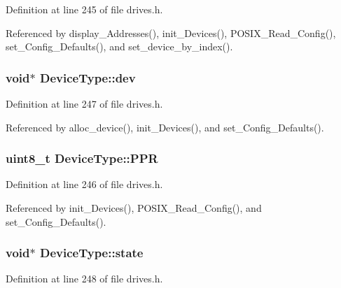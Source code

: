 Definition at line 245 of file drives.\+h.



Referenced by display\+\_\+\+Addresses(), init\+\_\+\+Devices(), P\+O\+S\+I\+X\+\_\+\+Read\+\_\+\+Config(), set\+\_\+\+Config\+\_\+\+Defaults(), and set\+\_\+device\+\_\+by\+\_\+index().

\subsubsection[{\texorpdfstring{dev}{dev}}]{\setlength{\rightskip}{0pt plus 5cm}void$\ast$ Device\+Type\+::dev}\hypertarget{structDeviceType_a59fc3b3cb45f8ee0cd1016bd64804d3b}{}\label{structDeviceType_a59fc3b3cb45f8ee0cd1016bd64804d3b}


Definition at line 247 of file drives.\+h.



Referenced by alloc\+\_\+device(), init\+\_\+\+Devices(), and set\+\_\+\+Config\+\_\+\+Defaults().

\subsubsection[{\texorpdfstring{P\+PR}{PPR}}]{\setlength{\rightskip}{0pt plus 5cm}uint8\+\_\+t Device\+Type\+::\+P\+PR}\hypertarget{structDeviceType_ae0e59c6c17582ff80bdab3f2010e8d57}{}\label{structDeviceType_ae0e59c6c17582ff80bdab3f2010e8d57}


Definition at line 246 of file drives.\+h.



Referenced by init\+\_\+\+Devices(), P\+O\+S\+I\+X\+\_\+\+Read\+\_\+\+Config(), and set\+\_\+\+Config\+\_\+\+Defaults().

\subsubsection[{\texorpdfstring{state}{state}}]{\setlength{\rightskip}{0pt plus 5cm}void$\ast$ Device\+Type\+::state}\hypertarget{structDeviceType_ad0fc43d63606bab6c259047e36512e08}{}\label{structDeviceType_ad0fc43d63606bab6c259047e36512e08}


Definition at line 248 of file drives.\+h.



